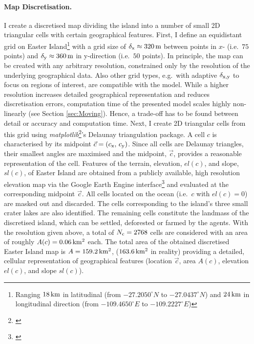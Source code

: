 \paragraph{Map Discretisation.}
I create a discretised map dividing the island into a number of small 2D triangular cells with certain geographical features.
First, I define an equidistant grid on Easter Island\footnote{Ranging $18\, {\rm km}$ in latitudinal (from $-27.2050^\circ N$ to $-27.0437^\circ N$) and $24\, {\rm km}$ in longitudinal direction (from  $-109.4650^\circ E$ to 
 $-109.2227^\circ E$)} with a grid size of $\delta_{\rm x} \approx 320\, {\rm m}$ between points in $x$- (i.e.\ $75$ points) and $\delta_{\rm y} \approx 360\, {\rm m}$ in y-direction (i.e.\ $50$ points). 
In principle, the map can be created with any arbitrary resolution, constrained only by the resolution of the underlying geographical data. 
Also other grid types, e.g.\ with adaptive $\delta_{\rm x,y}$ to focus on regions of interest, are compatible with the model. 
While a higher resolution increases detailed geographical representation and reduces discretisation errors, computation time of the presented model scales highly non-linearly (see Section \ref{sec:Moving}).
Hence, a trade-off has to be found between detail or accuracy and computation time.
Next, I create 2D triangular cells from this grid using \textit{matplotlib}\footnote{\citet{matplotlib}}'s Delaunay triangulation package.
A cell $c$ is characterised by its midpoint $\vec{c} = (c_{\rm x},\, c_{\rm y})$. 
Since all cells are Delaunay triangles, their smallest angles are maximised and the midpoint, $\vec{c}$, provides a reasonable representation of the cell.
Features of the terrain, elevation, $el(c)$, and slope, $sl(c)$, of Easter Island are obtained from a publicly available, high resolution elevation map \citep{Jarvis2008CIGAR} via the Google Earth Engine interface\footnote{\citet{gorelick2017google}} and evaluated at the corresponding midpoint $\vec{c}$.
All cells located on the ocean (i.e.\ $c$ with $el(c)=0$) are masked out and discarded.
The cells corresponding to the island's three small crater lakes are also identified.
The remaining cells constitute the landmass of the discretised island, which can be settled, deforested or farmed by the agents. 
With the resolution given above, a total of $N_{\rm c} = 2768$ cells are considered with an area of roughly $A(c)= 0.06 \, {\rm km^2}$ each.
The total area of the obtained discretised Easter Island map is $A=159.2\, {\rm km^2}$, ($163.6\, {\rm km^2}$ in reality) providing a detailed, cellular representation of geographical features (location $\vec{c}$, area $A(c)$, elevation $el(c)$, and slope $sl(c)$).

